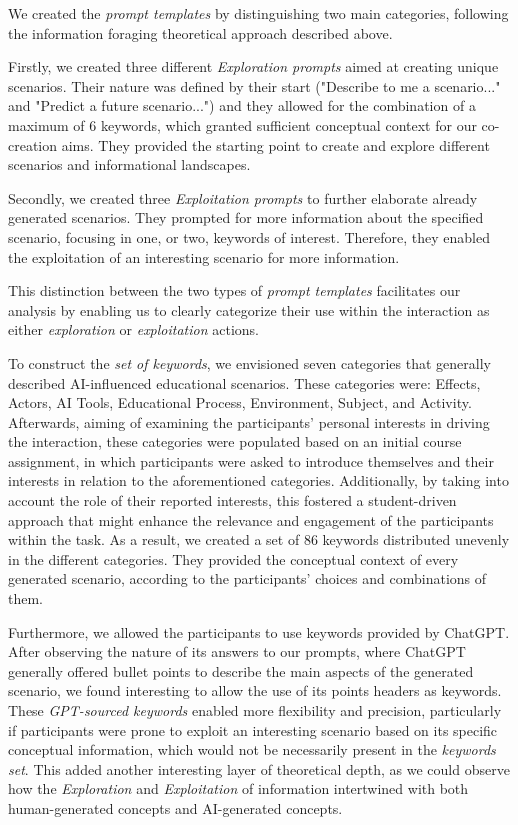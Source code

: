 \documentclass[sn-mathphys, Numbered]{sn-jnl}%
\theoremstyle{thmstyleone}%
\theoremstyle{thmstyletwo}%
\theoremstyle{thmstylethree}%
\begin{document}
We created the\textit{ prompt templates} by distinguishing two main categories, following the information foraging theoretical approach described above. 

Firstly, we created three different \textit{Exploration prompts} aimed at creating unique scenarios. Their nature was defined by their start ("Describe to me a scenario..." and "Predict a future scenario...") and they allowed for the combination of a maximum of 6 keywords, which granted sufficient conceptual context for our co-creation aims. They provided the starting point to create and explore different scenarios and informational landscapes.

Secondly, we created three \textit{Exploitation prompts} to further elaborate already generated scenarios. They prompted for more information about the specified scenario, focusing in one, or two, keywords of interest. Therefore, they enabled the exploitation of an interesting scenario for more information.

This distinction between the two types of \textit{prompt templates} facilitates our analysis by enabling us to clearly categorize their use within the interaction as either \textit{exploration} or \textit{exploitation} actions.

To construct the \textit{set of keywords}, we envisioned seven categories that generally described AI-influenced educational scenarios. These categories were: Effects, Actors, AI Tools, Educational Process, Environment, Subject, and Activity. Afterwards, aiming of examining the participants' personal interests in driving the interaction, these categories were populated based on an initial course assignment, in which participants were asked to introduce themselves and their interests in relation to the aforementioned categories. Additionally, by taking into account the role of their reported interests, this fostered a student-driven approach that might enhance the relevance and engagement of the participants within the task. As a result, we created a set of 86 keywords distributed unevenly in the different categories. They provided the conceptual context of every generated scenario, according to the participants' choices and combinations of them.

Furthermore, we allowed the participants to use keywords provided by ChatGPT. After observing the nature of its answers to our prompts, where ChatGPT generally offered bullet points to describe the main aspects of the generated scenario, we found interesting to allow the use of its points headers as keywords. These \textit{GPT-sourced keywords} enabled more flexibility and precision, particularly if participants were prone to exploit an interesting scenario based on its specific conceptual information, which would not be necessarily present in the \textit{keywords set}. This added another interesting layer of theoretical depth, as we could observe how the \textit{Exploration} and \textit{Exploitation} of information intertwined with both human-generated concepts and AI-generated concepts.
\end{document}
